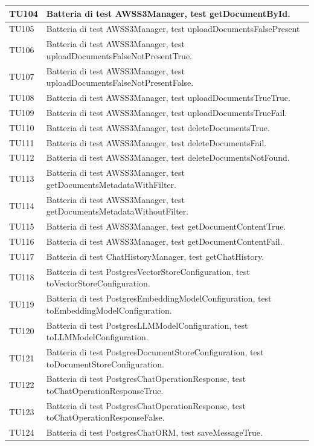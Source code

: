 \documentclass[10pt, a4paper]{article}
\begin{document}
\begin{xltabular}{\textwidth}{p{0.12\textwidth}|X}
\hline
TU104 & Batteria di test AWSS3Manager, test getDocumentById. \\
\hline
TU105 & Batteria di test AWSS3Manager, test uploadDocumentsFalsePresent\\
\hline
TU106 & Batteria di test AWSS3Manager, test uploadDocumentsFalseNotPresentTrue. \\
\hline
TU107 & Batteria di test AWSS3Manager, test uploadDocumentsFalseNotPresentFalse. \\
\hline
TU108 & Batteria di test AWSS3Manager, test uploadDocumentsTrueTrue. \\
\hline
TU109 & Batteria di test AWSS3Manager, test uploadDocumentsTrueFail. \\
\hline
TU110 & Batteria di test AWSS3Manager, test deleteDocumentsTrue. \\
\hline
TU111 & Batteria di test AWSS3Manager, test deleteDocumentsFail. \\
\hline
TU112 & Batteria di test AWSS3Manager, test deleteDocumentsNotFound. \\
\hline
TU113 & Batteria di test AWSS3Manager, test getDocumentsMetadataWithFilter. \\
\hline
TU114 & Batteria di test AWSS3Manager, test getDocumentsMetadataWithoutFilter. \\
\hline
TU115 & Batteria di test AWSS3Manager, test getDocumentContentTrue. \\
\hline
TU116 & Batteria di test AWSS3Manager, test getDocumentContentFail. \\
\hline
TU117 & Batteria di test ChatHistoryManager, test getChatHistory. \\
\hline
TU118 & Batteria di test PostgresVectorStoreConfiguration, test toVectorStoreConfiguration. \\
\hline
TU119 & Batteria di test PostgresEmbeddingModelConfiguration, test toEmbeddingModelConfiguration. \\
\hline
TU120 & Batteria di test PostgresLLMModelConfiguration, test toLLMModelConfiguration. \\
\hline
TU121 & Batteria di test PostgresDocumentStoreConfiguration, test toDocumentStoreConfiguration. \\
\hline
TU122 & Batteria di test PostgresChatOperationResponse, test toChatOperationResponseTrue. \\
\hline
TU123 & Batteria di test PostgresChatOperationResponse, test toChatOperationResponseFalse. \\
\hline
TU124 & Batteria di test PostgresChatORM, test saveMessageTrue. \\

\end{xltabular}
\end{document}
